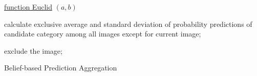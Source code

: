 \documentclass{article}
\begin{document}
\begin{algorithm}

    \underline{function Euclid} $(a,b)$\;
     {
    	 {
    		calculate exclusive average and standard deviation of probability predictions of candidate category among all images except for current image;
    		
    		 {
    			exclude the image;
    		}    		
    	}
    }
    \caption{Belief-based Prediction Aggregation}
\end{algorithm}
\end{document}

